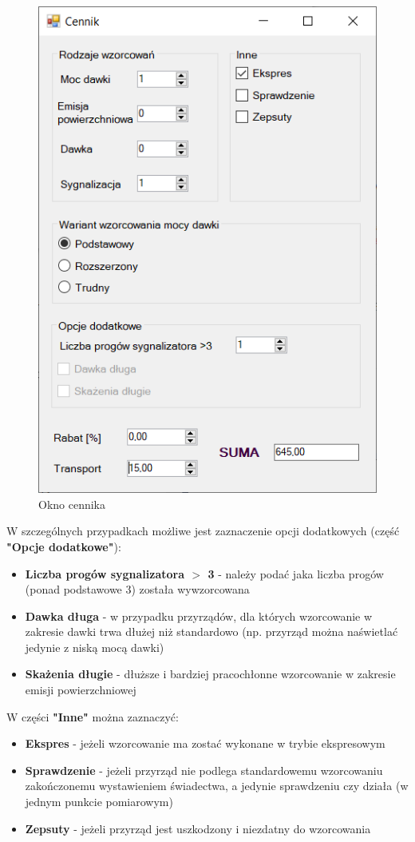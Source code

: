 \begin{figure}[htb]
	\centering
	\includegraphics{obrazki/Biuro/cennik.png}
	\caption{Okno cennika}
	\label{cennikRys}
\end{figure}

W szczególnych przypadkach możliwe jest zaznaczenie opcji dodatkowych (część \textbf{"Opcje dodatkowe"}):
\begin{itemize}
	\item \textbf{Liczba progów sygnalizatora $>$ 3} - należy podać jaka liczba progów (ponad podstawowe 3) została wywzorcowana
	\item \textbf{Dawka długa} - w przypadku przyrządów, dla których wzorcowanie w zakresie dawki trwa dłużej niż standardowo (np. przyrząd można naświetlać jedynie z niską mocą dawki)
	\item \textbf{Skażenia długie} - dłuższe i bardziej pracochłonne wzorcowanie w zakresie emisji powierzchniowej
\end{itemize}

W części \textbf{"Inne"} można zaznaczyć:
\begin{itemize}
	\item \textbf{Ekspres} - jeżeli wzorcowanie ma zostać wykonane w trybie ekspresowym
	\item \textbf{Sprawdzenie} - jeżeli przyrząd nie podlega standardowemu wzorcowaniu zakończonemu wystawieniem świadectwa, a jedynie sprawdzeniu czy działa (w jednym punkcie pomiarowym)
	\item \textbf{Zepsuty} - jeżeli przyrząd jest uszkodzony i niezdatny do wzorcowania
\end{itemize}

